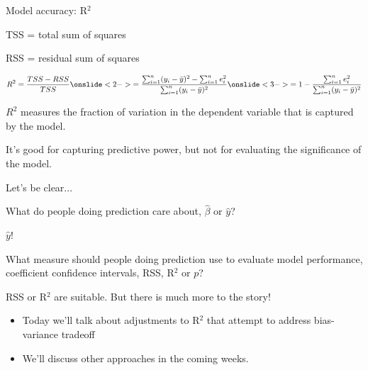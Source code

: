 \documentclass[aspectratio=169, handout]{beamer}
\begin{document}
\begin{frame}{Model accuracy: R$^2$}

TSS = total sum of squares

\vspace{3mm}

RSS = residual sum of squares

  \begin{align*}
    R^2 = \frac{TSS - RSS}{TSS} \onslide<2->{= \frac{\sum_{i=1}^n (y_i-\bar{y})^2 - \sum_{i=1}^n e_i^2}{\sum_{i=1}^n (y_i-\bar{y})^2}}\onslide<3->{ = 1-\frac{\sum_{i=1}^n e_i^2}{\sum_{i=1}^n (y_i-\bar{y})^2} }
  \end{align*}

  \pause\pause
  $R^2$ measures the fraction of variation in the dependent variable that is captured by the model.  

\pause
\vspace{5mm}

It's good for capturing predictive power, but not for evaluating the significance of the model.

\end{frame}


\begin{frame}{Let's be clear...}

What do people doing prediction care about, $\hat{\beta}$ or $\hat{y}$?

\vspace{5mm}
\pause

$\hat{y}$!

\vspace{5mm}
\pause

What measure should people doing prediction use to evaluate model performance, coefficient confidence intervals, RSS, R$^2$ or $p$?

\vspace{5mm}
\pause

RSS or R$^2$ are suitable.  But there is much more to the story! 
\begin{itemize}
  \item Today we'll talk about adjustments to R$^2$ that attempt to address bias-variance tradeoff
  \item  We'll discuss other approaches in the coming weeks.
\end{itemize}

\end{frame}
\end{document}
